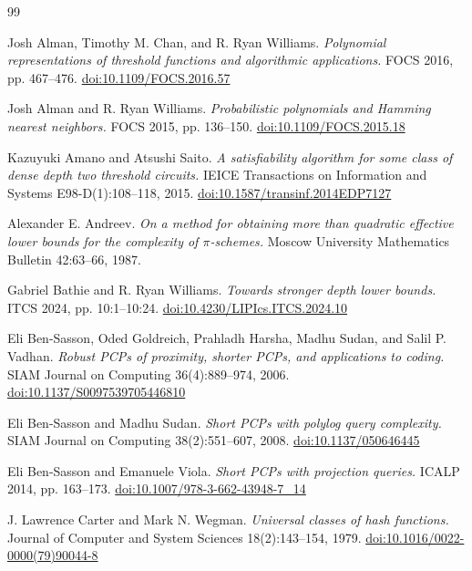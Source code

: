 \documentclass[11pt,letterpaper]{article}
\theoremstyle{definition}
\theoremstyle{remark}
\begin{document}
\begin{thebibliography}{99}
\raggedright

 Josh Alman, Timothy M. Chan, and R. Ryan Williams.
\emph{Polynomial representations of threshold functions and algorithmic
applications.} FOCS 2016, pp. 467--476.
\href{https://doi.org/10.1109/FOCS.2016.57}{doi:10.1109/FOCS.2016.57}

 Josh Alman and R. Ryan Williams. \emph{Probabilistic
polynomials and Hamming nearest neighbors.} FOCS 2015, pp. 136--150.
\href{https://doi.org/10.1109/FOCS.2015.18}{doi:10.1109/FOCS.2015.18}

 Kazuyuki Amano and Atsushi Saito. \emph{A satisfiability
algorithm for some class of dense depth two threshold circuits.} IEICE
Transactions on Information and Systems E98-D(1):108--118, 2015.
\href{https://doi.org/10.1587/transinf.2014EDP7127}{doi:10.1587/transinf.2014EDP7127}

 Alexander E. Andreev. \emph{On a method for obtaining more
than quadratic effective lower bounds for the complexity of
\(\pi\)-schemes.} Moscow University Mathematics Bulletin 42:63--66, 1987.

 Gabriel Bathie and R. Ryan Williams. \emph{Towards stronger
depth lower bounds.} ITCS 2024, pp. 10:1--10:24.
\href{https://doi.org/10.4230/LIPIcs.ITCS.2024.10}{doi:10.4230/LIPIcs.ITCS.2024.10}

 Eli Ben-Sasson, Oded Goldreich, Prahladh Harsha, Madhu
Sudan, and Salil P. Vadhan. \emph{Robust PCPs of proximity, shorter
PCPs, and applications to coding.} SIAM Journal on Computing
36(4):889--974, 2006.
\href{https://doi.org/10.1137/S0097539705446810}{doi:10.1137/S0097539705446810}

 Eli Ben-Sasson and Madhu Sudan. \emph{Short PCPs with polylog
query complexity.} SIAM Journal on Computing 38(2):551--607, 2008.
\href{https://doi.org/10.1137/050646445}{doi:10.1137/050646445}

 Eli Ben-Sasson and Emanuele Viola. \emph{Short PCPs with
projection queries.} ICALP 2014, pp. 163--173.
\href{https://doi.org/10.1007/978-3-662-43948-7_14}{doi:10.1007/978-3-662-43948-7\_14}

 J. Lawrence Carter and Mark N. Wegman. \emph{Universal
classes of hash functions.} Journal of Computer and System Sciences
18(2):143--154, 1979.
\href{https://doi.org/10.1016/0022-0000(79)90044-8}{doi:10.1016/0022-0000(79)90044-8}


\end{thebibliography}
\end{document}
